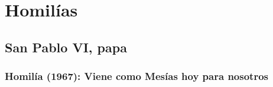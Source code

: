 
\newsection
\section{Homilías}

\subsection{San Pablo VI, papa}

\subsubsection{Homilía (1967): Viene como Mesías hoy para nosotros}


